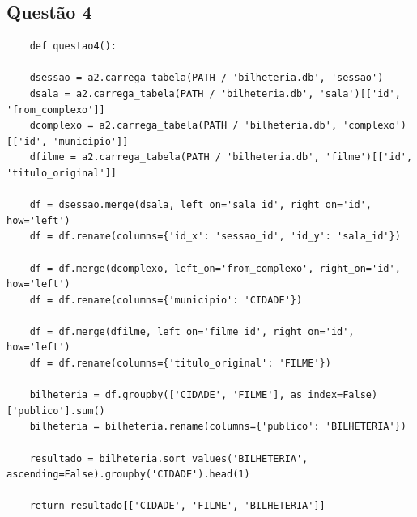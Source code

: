 \documentclass{article}
\begin{document}
\subsection*{Questão 4}
\begin{lstlisting}
    def questao4():
    
    dsessao = a2.carrega_tabela(PATH / 'bilheteria.db', 'sessao')
    dsala = a2.carrega_tabela(PATH / 'bilheteria.db', 'sala')[['id', 'from_complexo']]
    dcomplexo = a2.carrega_tabela(PATH / 'bilheteria.db', 'complexo')[['id', 'municipio']]
    dfilme = a2.carrega_tabela(PATH / 'bilheteria.db', 'filme')[['id', 'titulo_original']]

    df = dsessao.merge(dsala, left_on='sala_id', right_on='id', how='left')
    df = df.rename(columns={'id_x': 'sessao_id', 'id_y': 'sala_id'})  

    df = df.merge(dcomplexo, left_on='from_complexo', right_on='id', how='left')
    df = df.rename(columns={'municipio': 'CIDADE'})
    
    df = df.merge(dfilme, left_on='filme_id', right_on='id', how='left')
    df = df.rename(columns={'titulo_original': 'FILME'})

    bilheteria = df.groupby(['CIDADE', 'FILME'], as_index=False)['publico'].sum()
    bilheteria = bilheteria.rename(columns={'publico': 'BILHETERIA'})

    resultado = bilheteria.sort_values('BILHETERIA', ascending=False).groupby('CIDADE').head(1)

    return resultado[['CIDADE', 'FILME', 'BILHETERIA']]

\end{lstlisting}
\end{document}
